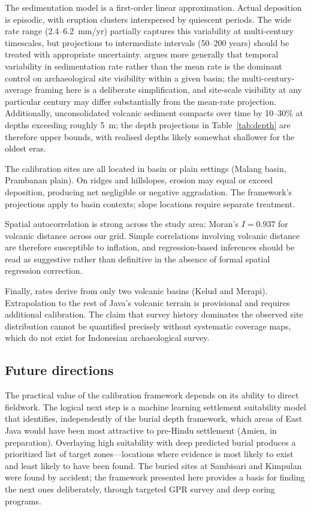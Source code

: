 \documentclass[12pt,a4paper]{article}
\begin{document}
The sedimentation model is a first-order linear approximation. Actual deposition is episodic, with eruption clusters interspersed by quiescent periods. The wide rate range (2.4--6.2~mm/yr) partially captures this variability at multi-century timescales, but projections to intermediate intervals (50--200 years) should be treated with appropriate uncertainty. \citet{ferring1986} argues more generally that temporal variability in sedimentation rate rather than the mean rate is the dominant control on archaeological site visibility within a given basin; the multi-century-average framing here is a deliberate simplification, and site-scale visibility at any particular century may differ substantially from the mean-rate projection. Additionally, unconsolidated volcanic sediment compacts over time by 10--30\% at depths exceeding roughly 5~m; the depth projections in Table~\ref{tab:depth} are therefore upper bounds, with realised depths likely somewhat shallower for the oldest eras.

The calibration sites are all located in basin or plain settings (Malang basin, Prambanan plain). On ridges and hillslopes, erosion may equal or exceed deposition, producing net negligible or negative aggradation. The framework's projections apply to basin contexts; slope locations require separate treatment.

Spatial autocorrelation is strong across the study area: Moran's $I = 0.937$ for volcanic distance across our grid. Simple correlations involving volcanic distance are therefore susceptible to inflation, and regression-based inferences should be read as suggestive rather than definitive in the absence of formal spatial regression correction.

Finally, rates derive from only two volcanic basins (Kelud and Merapi). Extrapolation to the rest of Java's volcanic terrain is provisional and requires additional calibration. The claim that survey history dominates the observed site distribution cannot be quantified precisely without systematic coverage maps, which do not exist for Indonesian archaeological survey.

\subsection{Future directions}

The practical value of the calibration framework depends on its ability to direct fieldwork. The logical next step is a machine learning settlement suitability model that identifies, independently of the burial depth framework, which areas of East Java would have been most attractive to pre-Hindu settlement (Amien, in preparation). Overlaying high suitability with deep predicted burial produces a prioritized list of target zones---locations where evidence is most likely to exist and least likely to have been found. The buried sites at Sambisari and Kimpulan were found by accident; the framework presented here provides a basis for finding the next ones deliberately, through targeted GPR survey and deep coring programs.
\end{document}

